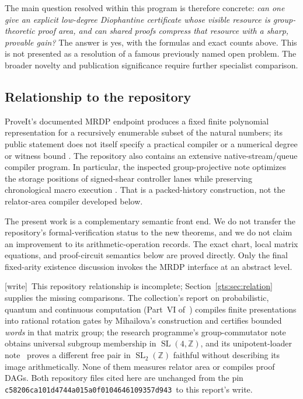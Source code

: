 \documentclass[11pt,letterpaper]{article}
\theoremstyle{definition}
\theoremstyle{remark}
\newcommand{\Z}{\mathbb Z}
\newcommand{\SL}{\operatorname{SL}}
\newcommand{\sha}{\texttt{c58206ca101d4744a015a0f0104646109357d943}}
\newcommand{\wtag}{\textup{[write]}}
\begin{document}
The main question resolved within this program is therefore concrete: \emph{can one give an explicit low-degree Diophantine certificate whose visible resource is group-theoretic proof area, and can shared proofs compress that resource with a sharp, provable gain?} The answer is yes, with the formulas and exact counts above. This is not presented as a resolution of a famous previously named open problem. The broader novelty and publication significance require further specialist comparison.

\subsection{Relationship to the repository}

ProveIt's documented MRDP endpoint produces a fixed finite polynomial representation for a recursively enumerable subset of the natural numbers; its public statement does not itself specify a practical compiler or a numerical degree or witness bound \cite{repo-mrdp}. The repository also contains an extensive native-stream/queue compiler program. In particular, the inspected group-projective note optimizes the storage positions of signed-shear controller lanes while preserving chronological macro execution \cite{repo-group}. That is a packed-history construction, not the relator-area compiler developed below.

The present work is a complementary semantic front end. We do not transfer the repository's formal-verification status to the new theorems, and we do not claim an improvement to its arithmetic-operation records. The exact chart, local matrix equations, and proof-circuit semantics below are proved directly. Only the final fixed-arity existence discussion invokes the MRDP interface at an abstract level.

\wtag\ This repository relationship is incomplete; Section~\ref{gts:sec:relation} supplies the missing comparisons. The collection's report on probabilistic, quantum and continuous computation (Part~VI of~\cite{pqc}) compiles finite presentations into rational rotation gates by Mihailova's construction and certifies bounded \emph{words} in that matrix group; the research programme's group-commutator note~\cite{repo-comm} obtains universal subgroup membership in $\SL(4,\Z)$, and its unipotent-loader note~\cite{repo-unip} proves a different free pair in $\SL_2(\Z)$ faithful without describing its image arithmetically. None of them measures relator area or compiles proof DAGs. Both repository files cited here are unchanged from the pin \sha\ to this report's write.
\end{document}
